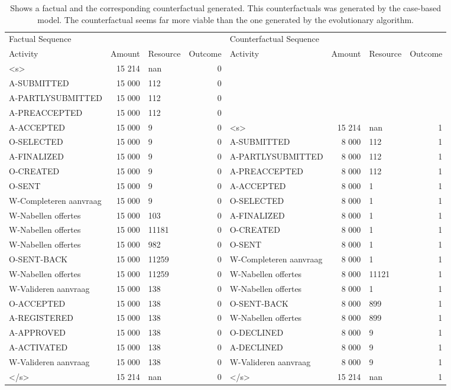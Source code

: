 \begin{table}
\caption{Shows a factual and the corresponding counterfactual generated. This counterfactuals was generated by the case-based model. The counterfactual seems far more viable than the one generated by the evolutionary algorithm.}
\label{tbl:example-cf-cbg}
\begin{tabular}{lrlrlrlr}
\toprule
\multicolumn{4}{l}{Factual Sequence} & \multicolumn{4}{l}{Counterfactual Sequence} \\
Activity & Amount & Resource & Outcome & Activity & Amount & Resource & Outcome \\
\midrule
<s> & 15 214 & nan & 0 &  &  &  &  \\
A-SUBMITTED & 15 000 & 112 & 0 &  &  &  &  \\
A-PARTLYSUBMITTED & 15 000 & 112 & 0 &  &  &  &  \\
A-PREACCEPTED & 15 000 & 112 & 0 &  &  &  &  \\
A-ACCEPTED & 15 000 & 9 & 0 & <s> & 15 214 & nan & 1 \\
O-SELECTED & 15 000 & 9 & 0 & A-SUBMITTED & 8 000 & 112 & 1 \\
A-FINALIZED & 15 000 & 9 & 0 & A-PARTLYSUBMITTED & 8 000 & 112 & 1 \\
O-CREATED & 15 000 & 9 & 0 & A-PREACCEPTED & 8 000 & 112 & 1 \\
O-SENT & 15 000 & 9 & 0 & A-ACCEPTED & 8 000 & 1 & 1 \\
W-Completeren aanvraag & 15 000 & 9 & 0 & O-SELECTED & 8 000 & 1 & 1 \\
W-Nabellen offertes & 15 000 & 103 & 0 & A-FINALIZED & 8 000 & 1 & 1 \\
W-Nabellen offertes & 15 000 & 11181 & 0 & O-CREATED & 8 000 & 1 & 1 \\
W-Nabellen offertes & 15 000 & 982 & 0 & O-SENT & 8 000 & 1 & 1 \\
O-SENT-BACK & 15 000 & 11259 & 0 & W-Completeren aanvraag & 8 000 & 1 & 1 \\
W-Nabellen offertes & 15 000 & 11259 & 0 & W-Nabellen offertes & 8 000 & 11121 & 1 \\
W-Valideren aanvraag & 15 000 & 138 & 0 & W-Nabellen offertes & 8 000 & 1 & 1 \\
O-ACCEPTED & 15 000 & 138 & 0 & O-SENT-BACK & 8 000 & 899 & 1 \\
A-REGISTERED & 15 000 & 138 & 0 & W-Nabellen offertes & 8 000 & 899 & 1 \\
A-APPROVED & 15 000 & 138 & 0 & O-DECLINED & 8 000 & 9 & 1 \\
A-ACTIVATED & 15 000 & 138 & 0 & A-DECLINED & 8 000 & 9 & 1 \\
W-Valideren aanvraag & 15 000 & 138 & 0 & W-Valideren aanvraag & 8 000 & 9 & 1 \\
</s> & 15 214 & nan & 0 & </s> & 15 214 & nan & 1 \\
\bottomrule
\end{tabular}
\end{table}
